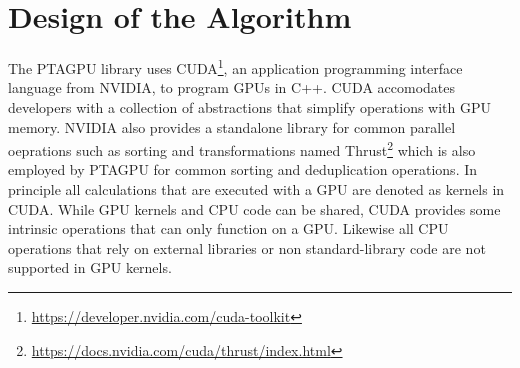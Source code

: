 \section{Design of the Algorithm}\label{sec:design}
The PTAGPU library uses CUDA\footnote{\url{https://developer.nvidia.com/cuda-toolkit}}, an application programming interface language from NVIDIA, to program GPUs in C++.
CUDA accomodates developers with a collection of abstractions that simplify operations with GPU memory. NVIDIA also provides a standalone library for common parallel oeprations such as sorting and transformations named Thrust\footnote{\url{https://docs.nvidia.com/cuda/thrust/index.html}} which is also employed by PTAGPU for common sorting and deduplication operations.
In principle all calculations that are executed with a GPU are denoted as kernels in CUDA. While GPU kernels and CPU code can be shared, CUDA provides some intrinsic operations that can only function on a GPU.
Likewise all CPU operations that rely on external libraries or non standard-library code are not supported in GPU kernels.

